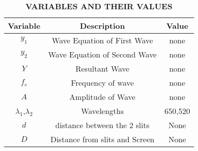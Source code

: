 \begin{table}[h!]
\renewcommand\thetable{1}
    \centering
    \begin{tabular}{|c|c|c|}
    \hline
       \textbf{Variable}& \textbf{Description}& \textbf{Value}\\\hline
         $y_1$& Wave Equation of First Wave&none\\\hline
          $y_2$&Wave Equation of Second Wave &none\\\hline
         $Y$&   Resultant Wave&none\\\hline
          $f_c$& Frequency of wave&none\\\hline
         $A$& Amplitude of Wave&none\\\hline
         $\lambda_{1}$,$\lambda_2$& Wavelengths&650,520\\\hline
         $d$& distance between the 2 slits&None\\\hline
         $D$& Distance from slits and Screen&None\\\hline
    \end{tabular}
    \caption{\textbf{VARIABLES AND THEIR VALUES}}
    \label{tab_12/10/6/1}
\end{table}
